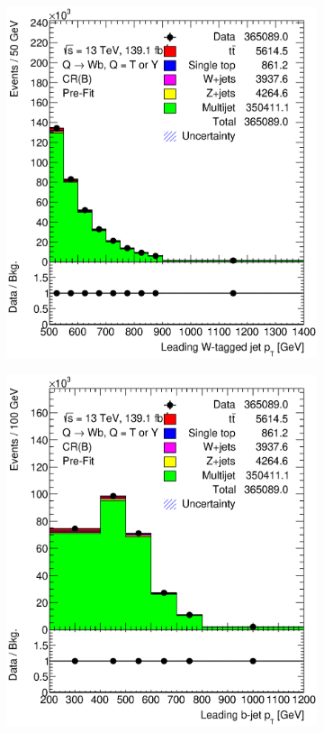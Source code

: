 \begin{figure}[hbt!]
	\centering
	\graphicspath{{figs/appendix/CRB/}}
	\begin{subfigure}{.35\textwidth}
		\centering
		\includegraphics[width=\linewidth,height=\textheight,keepaspectratio]{CR_B_ljet_pt.eps}
		\caption{}
		\label{fig:app:cr_b:ljet_pt}
	\end{subfigure}\hspace{0.6cm}
	\begin{subfigure}{.35\textwidth}
		\centering
		\includegraphics[width=\linewidth,height=\textheight,keepaspectratio]{CR_B_jet_pt.eps}

\end{subfigure}
\end{figure}

